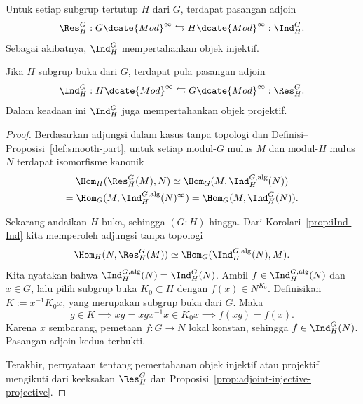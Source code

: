 \begin{proposition}\label{prop:Ind-injective-profinite}
	Untuk setiap subgrup tertutup $H$ dari $G$, terdapat pasangan adjoin
	\[ \Res^G_H:G\dcate{Mod}^\infty
	\leftrightarrows H\dcate{Mod}^\infty:\Ind^G_H. \]
	Sebagai akibatnya, $\Ind^G_H$ mempertahankan objek injektif.

	Jika $H$ subgrup buka dari $G$, terdapat pula pasangan adjoin
	\[ \Ind^G_H:H\dcate{Mod}^\infty
	\leftrightarrows G\dcate{Mod}^\infty:\Res^G_H. \]
	Dalam keadaan ini $\Ind^G_H$ juga mempertahankan objek projektif.
\end{proposition}
\begin{proof}
	Berdasarkan adjungsi dalam kasus tanpa topologi dan
	Definisi--Proposisi~\ref{def:smooth-part}, untuk setiap modul-$G$ mulus $M$
	dan modul-$H$ mulus $N$ terdapat isomorfisme kanonik
	\begin{multline*}
		\Hom_H(\Res^G_H(M),N)
		\simeq\Hom_G(M,\Ind^{G,\mathrm{alg}}_H(N))\\
		=\Hom_G(M,\Ind^{G,\mathrm{alg}}_H(N)^\infty)
		=\Hom_G(M,\Ind^G_H(N)).
	\end{multline*}

	Sekarang andaikan $H$ buka, sehingga $(G:H)$ hingga. Dari
	Korolari~\ref{prop:iInd-Ind} kita memperoleh adjungsi tanpa topologi
	\[ \Hom_H(N,\Res^G_H(M))
	\simeq\Hom_G(\Ind^{G,\mathrm{alg}}_H(N),M). \]
	Kita nyatakan bahwa
	$\Ind^{G,\mathrm{alg}}_H(N)=\Ind^G_H(N)$. Ambil
	$f\in\Ind^{G,\mathrm{alg}}_H(N)$ dan $x\in G$, lalu pilih subgrup buka
	$K_0\subset H$ dengan $f(x)\in N^{K_0}$. Definisikan
	$K:=x^{-1}K_0x$, yang merupakan subgrup buka dari $G$. Maka
	\[ g\in K\implies xg=xgx^{-1}x\in K_0x
	\implies f(xg)=f(x). \]
	Karena $x$ sembarang, pemetaan $f:G\to N$ lokal konstan, sehingga
	$f\in\Ind^G_H(N)$. Pasangan adjoin kedua terbukti.

	Terakhir, pernyataan tentang pemertahanan objek injektif atau projektif
	mengikuti dari keeksakan $\Res^G_H$ dan
	Proposisi~\ref{prop:adjoint-injective-projective}.
\end{proof}

